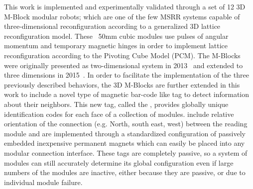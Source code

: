This work is implemented and experimentally validated through a set of 12 3D M-Block modular robots; which are one of the few MSRR systems capable of three-dimensional reconfiguration according to a generalized 3D lattice reconfiguration model. These ~50mm cubic modules use pulses of angular momentum and temporary magnetic hinges in order to implement lattice reconfiguration according to the Pivoting Cube Model (PCM). The M-Blocks were originally presented as two-dimensional system in 2013~\cite{RomanishinRus-IROS13} and extended to three dimensions in 2015~\cite{Romanishin20153d}. In order to facilitate the implementation of the three previously described behaviors, the 3D M-Blocks are further extended in this work to include a novel type of magnetic bar-code like tag to detect information about their neighbors. This new tag, called the \tagNamePlural, provides globally unique identification codes for each face of a collection of modules. \textit{\TagNamePlural} include relative orientation of the connection (e.g. North, south east, west) between the reading module and are implemented through a standardized configuration of passively embedded inexpensive permanent magnets which can easily be placed into any modular connection interface. These tags are completely passive, so a system of modules can still accurately determine its global configuration even if large numbers of the modules are inactive, either because they are passive, or due to individual module failure.



%
%	
%
%
%
%
%
%
